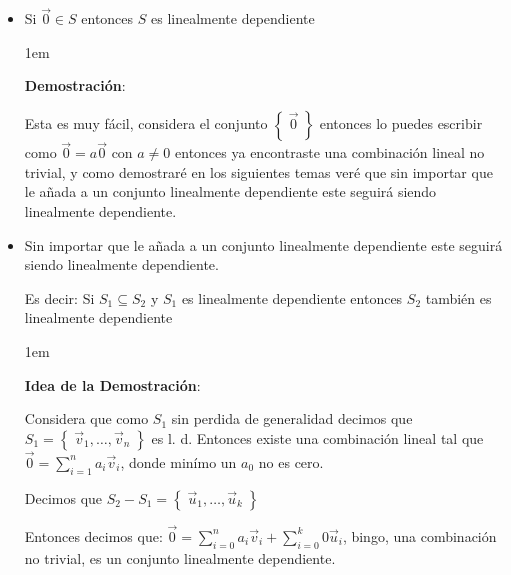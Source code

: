 \documentclass[12pt, fleqn]{report}                             %
\newenvironment{SmallIndentation}[1][0.75em]                    %
        {\begin{adjustwidth}{#1}{}\begin{footnotesize}}             %
        {\end{footnotesize}\end{adjustwidth}}                       %
\theoremstyle{break}                                            %
\newcommand{\Set}[1]            {\left\{ \; #1 \; \right\}}     %
\begin{document}
            \begin{itemize}
                
                \item 
                    Si $\vec 0 \in S$ entonces $S$ es linealmente dependiente

                    \begin{SmallIndentation}[1em]
                        \textbf{Demostración}:
                        
                        Esta es muy fácil, considera el conjunto $\Set{\vec 0}$ entonces lo puedes
                        escribir como $\vec 0 = a \vec 0$ con $a \neq 0$ entonces ya encontraste 
                        una combinación lineal no trivial, y como demostraré en los siguientes temas
                        veré que sin importar que le añada a un conjunto linealmente dependiente este
                        seguirá siendo linealmente dependiente.
                    
                    \end{SmallIndentation}
                        

                \item 
                    Sin importar que le añada a un conjunto linealmente dependiente este
                    seguirá siendo linealmente dependiente.

                    Es decir:
                    Si $S_1 \subseteq S_2$ y $S_1$ es linealmente dependiente entonces
                    $S_2$ también es linealmente dependiente

                    \begin{SmallIndentation}[1em]
                        \textbf{Idea de la Demostración}:
                        
                        Considera que como $S_1$ sin perdida de generalidad decimos que 
                        $S_1 = \Set{\vec v_1, \dots, \vec v_n}$ es l. d. Entonces existe una combinación lineal
                        tal que $\vec 0 = \sum_{i=1}^n a_i \vec v_i$, donde minímo un $a_0$ no es cero.

                        Decimos que $S_2 - S_1 = \Set{\vec u_1, \dots, \vec u_k}$

                        Entonces decimos que:
                        $\vec 0 = \sum_{i=0}^n a_i \vec v_i +  \sum_{i=0}^k 0 \vec u_i$, bingo, una combinación
                        no trivial, es un conjunto linealmente dependiente.
                    

\end{SmallIndentation}
\end{itemize}
\end{document}
